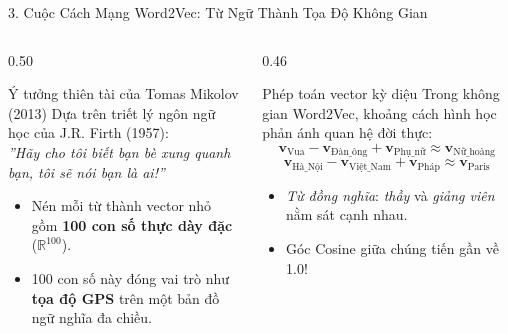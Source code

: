 \documentclass[aspectratio=169, 10pt]{beamer}
\begin{document}
\begin{frame}{3. Cuộc Cách Mạng Word2Vec: Từ Ngữ Thành Tọa Độ Không Gian}
  \begin{columns}[T, onlytextwidth]
    \begin{column}{0.50\textwidth}
      \begin{block}{Ý tưởng thiên tài của Tomas Mikolov (2013)}
        \fontsize{7.5}{9.5}\selectfont
        Dựa trên triết lý ngôn ngữ học của J.R. Firth (1957):\\
        \centering\textit{''Hãy cho tôi biết bạn bè xung quanh bạn, tôi sẽ nói bạn là ai!''}
        \vspace{0.15cm}
        \raggedright
        \begin{itemize}\setlength{\itemsep}{0.15em}
          \item Nén mỗi từ thành vector nhỏ gồm \textbf{100 con số thực dày đặc} ($\mathbb{R}^{100}$).
          \item 100 con số này đóng vai trò như \textbf{tọa độ GPS} trên một bản đồ ngữ nghĩa đa chiều.
        \end{itemize}
      \end{block}
    \end{column}
    \hfill
    \begin{column}{0.46\textwidth}
      \begin{exampleblock}{Phép toán vector kỳ diệu}
        \fontsize{7.5}{9.5}\selectfont
        Trong không gian Word2Vec, khoảng cách hình học phản ánh quan hệ đời thực:
        \vspace{-0.15cm}
        $$\mathbf{v}_{\text{Vua}} - \mathbf{v}_{\text{Đàn\_ông}} + \mathbf{v}_{\text{Phụ\_nữ}} \approx \mathbf{v}_{\text{Nữ\_hoàng}}$$
        $$\mathbf{v}_{\text{Hà\_Nội}} - \mathbf{v}_{\text{Việt\_Nam}} + \mathbf{v}_{\text{Pháp}} \approx \mathbf{v}_{\text{Paris}}$$
        \begin{itemize}\setlength{\itemsep}{0.15em}
          \item \textit{Từ đồng nghĩa}: \textit{thầy} và \textit{giảng viên} nằm sát cạnh nhau.
          \item Góc Cosine giữa chúng tiến gần về 1.0!
        \end{itemize}
      \end{exampleblock}
    \end{column}
  \end{columns}
\end{frame}
\end{document}
